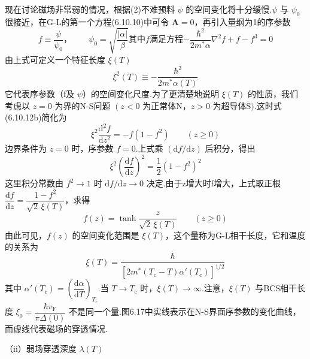 现在讨论磁场非常弱的情况，根据(2)不难预料 $\psi$ 的空间变化将十分缓慢.$\psi$ 与 $\psi_{0}$ 很接近，在G-L的第一个方程(6.10.10)中可令 $\boldsymbol{A}=0$，再引入量纲为1的序参数
\begin{subequations}
\begin{equation}
  f\equiv\frac{\psi}{\psi_{0}}\text{，}
  \qquad \psi_{0}=\sqrt{\frac{|\alpha|}{\beta}}
\end{equation}
其中f满足方程
\begin{equation}
  -\frac{\hbar^{2}}{2m^{*}\alpha}\nabla^{2}f+f-f^{3}=0
\end{equation}
\end{subequations}
由上式可定义一个特征长度 $\xi(T)$
\begin{equation}
  \xi^{2}(T)\equiv-\frac{\hbar^{2}}{2m^{*}\alpha(T)}
\end{equation}
它代表序参数（f及 $\psi$）的空间变化尺度.为了更清楚地说明 $\xi(T)$ 的性质，我们考虑以 $z=0$ 为界的N-S问题 $\left(z<0\right.$ 为正常体N，$z>0$ 为超导体S$)$.这时式(6.10.12b)简化为
\begin{equation}
  \xi^{2}\frac{\mathrm{d}^{2}f}{\mathrm{d}z^{2}}=-f\left(1-f^{2}\right)
  \qquad(z\geqslant0)
\end{equation}
边界条件为 $z=0$ 时，序参数 $f=0$.上式乘 $\left(\mathrm{d}f/\mathrm{d}z\right)$ 后积分，得出
\begin{equation}
  \xi^{2}\left(\frac{\mathrm{d}f}{\mathrm{d}z}\right)^{2}
  =\frac{1}{2}\left(1-f^{2}\right)^{2}
\end{equation}
这里积分常数由 $f^{2}\to1$ 时 $\mathrm{d}f/\mathrm{d}z\to0$ 决定.由于z增大时f增大，上式取正根
$\dfrac{\mathrm{d}f}{\mathrm{d}z}=\dfrac{1-f^{2}}{\sqrt{2}\,\xi(T)}$，求得
\begin{equation}
  f(z)=\tanh\frac{z}{\sqrt{2}\,\xi(T)}
  \qquad(z\geqslant0)
\end{equation}
由此可见，$f(z)$ 的空间变化范围是 $\xi(T)$，这个量称为G-L相干长度，它和温度的关系为
\begin{equation}
  \xi(T)=\frac{\hbar}{\left[2m^{*}\left(T_{\mathrm{c}}-T\right)
  \alpha'\left(T_{\mathrm{c}}\right)\right]^{1/2}}
\end{equation}
其中 $\alpha'\left(T_{\mathrm{c}}\right)=\left(\dfrac{\mathrm{d}\alpha}{\mathrm{d}T}\right)_{T_{\mathrm{c}}}$.当 $T\to T_{\mathrm{c}}$ 时，$\xi(T)\to\infty$.注意，$\xi(T)$ 与BCS相干长度 $\xi_{0}=\dfrac{\hbar v_{\mathrm{F}}}{\pi\Delta(0)}$ 不是同一个量.图6.17中实线表示在N-S界面序参数的变化曲线，而虚线代表磁场的穿透情况.

（ii）弱场穿透深度 $\lambda(T)$

